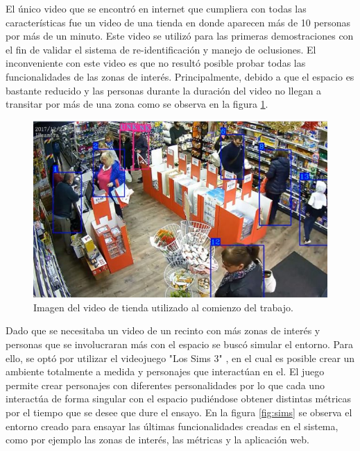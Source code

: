 El único video que se encontró en internet que cumpliera con todas las características fue un video de una tienda \citep{TIENDA_ORIGINAL} en donde aparecen más de 10 personas por más de un minuto. Este video se utilizó para las primeras demostraciones \citep{DEMO:1} con el fin de validar el sistema de re-identificación y manejo de oclusiones. El inconveniente con este video es que no resultó posible probar todas las funcionalidades de las zonas de interés. Principalmente, debido a que el espacio es bastante reducido y las personas durante la duración del video no llegan a transitar por más de una zona como se observa en la figura \ref{fig:tienda}.

\begin{figure}[ht]
	\centering
	\includegraphics[scale=.70]{./Figures/tienda.jpg}
	\caption{Imagen del video de tienda utilizado al comienzo del trabajo.}
	\label{fig:tienda}
\end{figure}

\newpage

Dado que se necesitaba un video de un recinto con más zonas de interés y personas que se involucraran más con el espacio se buscó simular el entorno. Para ello, se optó por utilizar el videojuego "Los Sims 3" \citep{SIMS3}, en el cual es posible crear un ambiente totalmente a medida y personajes que interactúan en el. El juego permite crear personajes con diferentes personalidades por lo que cada uno interactúa de forma singular con el espacio pudiéndose obtener distintas métricas por el tiempo que se desee que dure el ensayo. En la figura \ref{fig:sims} se observa el entorno creado para ensayar las últimas funcionalidades creadas en el sistema, como por ejemplo las zonas de interés, las métricas y la aplicación web.

